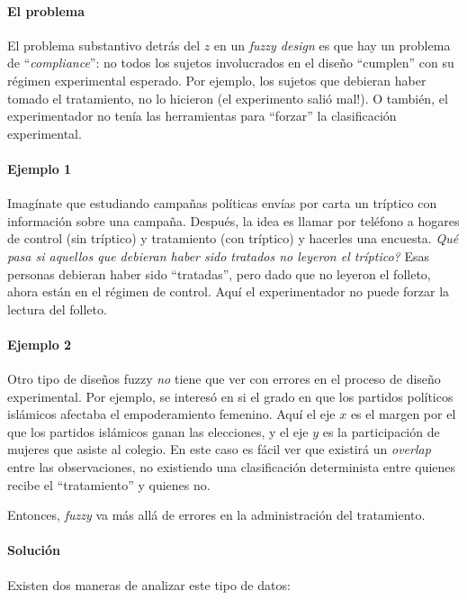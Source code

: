\documentclass[onesided]{article}\usepackage[]{graphicx}\usepackage[]{color}
\begin{document}
\paragraph{El problema}El problema substantivo detr\'as del $z$ en un \emph{fuzzy design} es que hay un problema de ``\emph{compliance}'': no todos los sujetos involucrados en el dise\~no ``cumplen'' con su r\'egimen experimental esperado. Por ejemplo, los sujetos que debieran haber tomado el tratamiento, no lo hicieron (el experimento sali\'o mal!). O tambi\'en, el experimentador no ten\'ia las herramientas para ``forzar'' la clasificaci\'on experimental. 

\paragraph{Ejemplo 1}Imag\'inate que estudiando campa\~nas pol\'iticas env\'ias por carta un tr\'iptico con informaci\'on sobre una campa\~na. Despu\'es, la idea es llamar por tel\'efono a hogares de control (sin tr\'iptico) y tratamiento (con tr\'iptico) y hacerles una encuesta. \emph{Qu\'e pasa si aquellos que debieran haber sido tratados no leyeron el tr\'iptico?} Esas personas debieran haber sido ``tratadas'', pero dado que no leyeron el folleto, ahora est\'an en el r\'egimen de control. Aqu\'i el experimentador no puede forzar la lectura del folleto. 

\paragraph{Ejemplo 2}Otro tipo de dise\~nos fuzzy \emph{no} tiene que ver con errores en el proceso de dise\~no experimental. Por ejemplo, \textcite[244]{ErikMe2014} se interes\'o en si el grado en que los partidos pol\'iticos isl\'amicos afectaba el empoderamiento femenino. Aqu\'i el eje $x$ es el margen por el que los partidos isl\'amicos ganan las elecciones, y el eje $y$ es la participaci\'on de mujeres que asiste al colegio. En este caso es f\'acil ver que existir\'a un \emph{overlap} entre las observaciones, no existiendo una clasificaci\'on determinista entre quienes recibe el ``tratamiento'' y quienes no.

Entonces, \emph{fuzzy} va m\'as all\'a de errores en la administraci\'on del tratamiento.

\paragraph{Soluci\'on} Existen dos maneras de analizar este tipo de datos:
\end{document}
